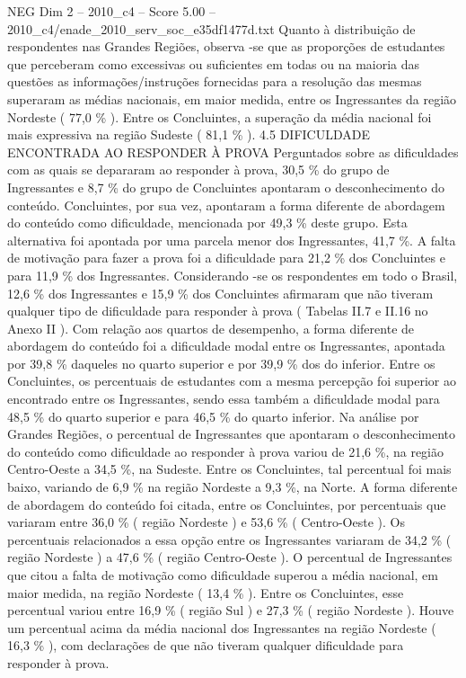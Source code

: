 \begin{textsample}{NEG Dim 2 – 2010\_c4 – Score 5.00 – 2010\_c4/enade\_2010\_serv\_soc\_e35df1477d.txt}
Quanto à distribuição de respondentes nas Grandes Regiões, observa -se que as proporções de estudantes que perceberam como excessivas ou suficientes em todas ou na maioria das questões as informações/instruções fornecidas para a resolução das mesmas superaram as médias nacionais, em maior medida, entre os Ingressantes da região Nordeste ( 77,0 \% ).
Entre os Concluintes, a superação da média nacional foi mais expressiva na região Sudeste ( 81,1 \% ). 4.5 DIFICULDADE ENCONTRADA AO RESPONDER À PROVA Perguntados sobre as dificuldades com as quais se depararam ao responder à prova, 30,5 \% do grupo de Ingressantes e 8,7 \% do grupo de Concluintes apontaram o desconhecimento do conteúdo.
Concluintes, por sua vez, apontaram a forma diferente de abordagem do conteúdo como dificuldade, mencionada por 49,3 \% deste grupo.
Esta alternativa foi apontada por uma parcela menor dos Ingressantes, 41,7 \%.
A falta de motivação para fazer a prova foi a dificuldade para 21,2 \% dos Concluintes e para 11,9 \% dos Ingressantes.
Considerando -se os respondentes em todo o Brasil, 12,6 \% dos Ingressantes e 15,9 \% dos Concluintes afirmaram que não tiveram qualquer tipo de dificuldade para responder à prova ( Tabelas II.7 e II.16 no Anexo II ).
Com relação aos quartos de desempenho, a forma diferente de abordagem do conteúdo foi a dificuldade modal entre os Ingressantes, apontada por 39,8 \% daqueles no quarto superior e por 39,9 \% dos do inferior.
Entre os Concluintes, os percentuais de estudantes com a mesma percepção foi superior ao encontrado entre os Ingressantes, sendo essa também a dificuldade modal para 48,5 \% do quarto superior e para 46,5 \% do quarto inferior.
Na análise por Grandes Regiões, o percentual de Ingressantes que apontaram o desconhecimento do conteúdo como dificuldade ao responder à prova variou de 21,6 \%, na região Centro-Oeste a 34,5 \%, na Sudeste.
Entre os Concluintes, tal percentual foi mais baixo, variando de 6,9 \% na região Nordeste a 9,3 \%, na Norte.
A forma diferente de abordagem do conteúdo foi citada, entre os Concluintes, por percentuais que variaram entre 36,0 \% ( região Nordeste ) e 53,6 \% ( Centro-Oeste ).
Os percentuais relacionados a essa opção entre os Ingressantes variaram de 34,2 \% ( região Nordeste ) a 47,6 \% ( região Centro-Oeste ).
O percentual de Ingressantes que citou a falta de motivação como dificuldade superou a média nacional, em maior medida, na região Nordeste ( 13,4 \% ).
Entre os Concluintes, esse percentual variou entre 16,9 \% ( região Sul ) e 27,3 \% ( região Nordeste ).
Houve um percentual acima da média nacional dos Ingressantes na região Nordeste ( 16,3 \% ), com declarações de que não tiveram qualquer dificuldade para responder à prova.

\end{textsample}
